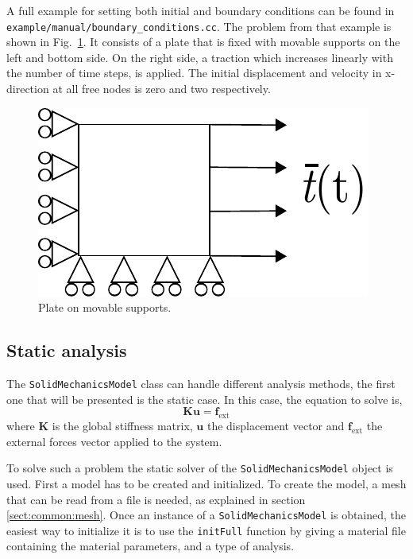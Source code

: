 \documentclass[a4paper,11pt]{book}
\newcommand{\code}[1]{\texttt{#1}}
\renewcommand{\vec}[1]{\ensuremath{\boldsymbol{#1}}}
\newcommand{\mat}[1]{\ensuremath{\boldsymbol{#1}}}
\newcommand{\st}[1]{{\mathrm{#1}}}
\begin{document}
A full example for setting both  initial and boundary conditions can be found in
\code{example/manual/boundary\_conditions.cc}.  The problem from that example is
shown in Fig.~\ref{fig:smm:bc_and_ic}. It consists of a plate that is fixed with
movable supports  on the  left and bottom  side. On  the right side,  a traction
which increases linearly with the number  of time steps, is applied. The initial
displacement  and velocity  in x-direction  at all  free nodes  is zero  and two
respectively.
\begin{figure}[!htb]
  \centering
  \includegraphics[scale=0.8]{figures/bc_and_ic_example}
  \caption{Plate on movable supports.\label{fig:smm:bc_and_ic}}
\end{figure}


\subsection{Static analysis\label{sect:smm:static}}

The \code{SolidMechanicsModel} class can  handle different analysis methods, the
first one that will be presented is the static case.  In this case, the equation
to solve is,
\begin{equation}\label{eqn:smm:static}
  \mat{K} \vec{u} = \vec{f_{\st{ext}}}
\end{equation}
where  $\mat{K}$ is  the  global stiffness  matrix,  $\vec{u}$ the  displacement
vector  and  $\vec{f_{\st{ext}}}$ the  external  forces  vector  applied to  the
system.


To     solve    such     a    problem     the    static     solver     of    the
\code{SolidMechanicsModel}  object is used.   First a
model has to be  created and initialized.  To create the model,  a mesh that can
be read from  a file is needed, as  explained in section \ref{sect:common:mesh}.
Once an instance of a \code{SolidMechanicsModel} is obtained, the easiest way to
initialize it is  to use the \code{initFull}
function by  giving a  material file containing  the material parameters,  and a
type of analysis.
\end{document}
